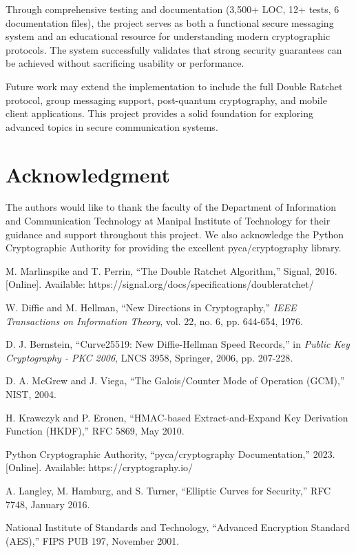 \documentclass[conference]{IEEEtran}
\begin{document}
Through comprehensive testing and documentation (3,500+ LOC, 12+ tests, 6 documentation files), the project serves as both a functional secure messaging system and an educational resource for understanding modern cryptographic protocols. The system successfully validates that strong security guarantees can be achieved without sacrificing usability or performance.

Future work may extend the implementation to include the full Double Ratchet protocol, group messaging support, post-quantum cryptography, and mobile client applications. This project provides a solid foundation for exploring advanced topics in secure communication systems.

\section*{Acknowledgment}

The authors would like to thank the faculty of the Department of Information and Communication Technology at Manipal Institute of Technology for their guidance and support throughout this project. We also acknowledge the Python Cryptographic Authority for providing the excellent pyca/cryptography library.

\begin{thebibliography}{00}
 M. Marlinspike and T. Perrin, ``The Double Ratchet Algorithm,'' Signal, 2016. [Online]. Available: https://signal.org/docs/specifications/doubleratchet/

 W. Diffie and M. Hellman, ``New Directions in Cryptography,'' \textit{IEEE Transactions on Information Theory}, vol. 22, no. 6, pp. 644-654, 1976.

 D. J. Bernstein, ``Curve25519: New Diffie-Hellman Speed Records,'' in \textit{Public Key Cryptography - PKC 2006}, LNCS 3958, Springer, 2006, pp. 207-228.

 D. A. McGrew and J. Viega, ``The Galois/Counter Mode of Operation (GCM),'' NIST, 2004.

 H. Krawczyk and P. Eronen, ``HMAC-based Extract-and-Expand Key Derivation Function (HKDF),'' RFC 5869, May 2010.

 Python Cryptographic Authority, ``pyca/cryptography Documentation,'' 2023. [Online]. Available: https://cryptography.io/

 A. Langley, M. Hamburg, and S. Turner, ``Elliptic Curves for Security,'' RFC 7748, January 2016.

 National Institute of Standards and Technology, ``Advanced Encryption Standard (AES),'' FIPS PUB 197, November 2001.
\end{thebibliography}
\end{document}
